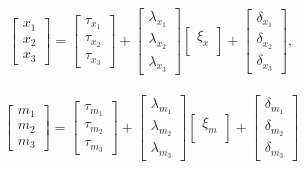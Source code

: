 \documentclass[
  man]{apa6}
\begin{document}
\begin{align}
    \begin{bmatrix}
        x_{1} \\
        x_{2} \\ 
        x_{3}
    \end{bmatrix} =
    \begin{bmatrix}
        \tau_{x_{1}} \\
        \tau_{x_{2}} \\ 
        \tau_{x_{3}}
    \end{bmatrix} +
    \begin{bmatrix}
        \lambda_{x_{1}} \\
        \lambda_{x_{2}} \\ 
        \lambda_{x_{3}}
    \end{bmatrix}
    \begin{bmatrix}
        \xi_{x} \\
    \end{bmatrix} +
    \begin{bmatrix}
        \delta_{x_{1}} \\
        \delta_{x_{2}} \\ 
        \delta_{x_{3}}
    \end{bmatrix},
\end{align}

\begin{align}
    \begin{bmatrix}
        m_{1} \\
        m_{2} \\ 
        m_{3}
    \end{bmatrix} =
    \begin{bmatrix}
        \tau_{m_{1}} \\
        \tau_{m_{2}} \\ 
        \tau_{m_{3}}
    \end{bmatrix} +
    \begin{bmatrix}
        \lambda_{m_{1}} \\
        \lambda_{m_{2}} \\ 
        \lambda_{m_{3}}
    \end{bmatrix}
    \begin{bmatrix}
        \xi_{m} \\
    \end{bmatrix} +
    \begin{bmatrix}
        \delta_{m_{1}} \\
        \delta_{m_{2}} \\ 
        \delta_{m_{3}}
    \end{bmatrix}
\end{align}
\end{document}
